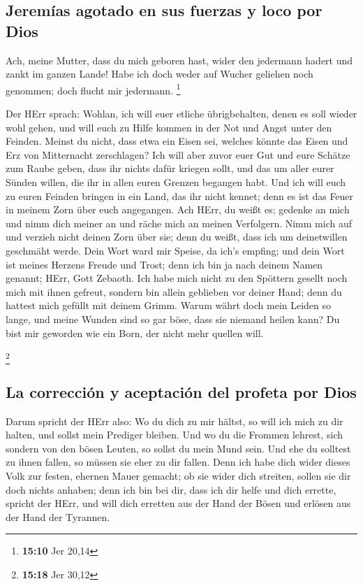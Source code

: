 \hypertarget{jeremuxedas-agotado-en-sus-fuerzas-y-loco-por-dios}{%
\subsection{Jeremías agotado en sus fuerzas y loco por
Dios}\label{jeremuxedas-agotado-en-sus-fuerzas-y-loco-por-dios}}

 Ach, meine Mutter, dass du mich geboren hast, wider den
jedermann hadert und zankt im ganzen Lande! Habe ich doch weder auf
Wucher geliehen noch genommen; doch flucht mir jedermann. \footnote{\textbf{15:10}
  Jer 20,14}

 Der HErr sprach: Wohlan, ich will euer etliche
übrigbehalten, denen es soll wieder wohl gehen, und will euch zu Hilfe
kommen in der Not und Angst unter den Feinden.  Meinst du
nicht, dass etwa ein Eisen sei, welches könnte das Eisen und Erz von
Mitternacht zerschlagen?  Ich will aber zuvor euer Gut
und eure Schätze zum Raube geben, dass ihr nichts dafür kriegen sollt,
und das um aller eurer Sünden willen, die ihr in allen euren Grenzen
begangen habt.  Und ich will euch zu euren Feinden
bringen in ein Land, das ihr nicht kennet; denn es ist das Feuer in
meinem Zorn über euch angegangen.  Ach HErr, du weißt es;
gedenke an mich und nimm dich meiner an und räche mich an meinen
Verfolgern. Nimm mich auf und verzieh nicht deinen Zorn über sie; denn
du weißt, dass ich um deinetwillen geschmäht werde.  Dein
Wort ward mir Speise, da ich's empfing; und dein Wort ist meines Herzens
Freude und Trost; denn ich bin ja nach deinem Namen genannt; HErr, Gott
Zebaoth.  Ich habe mich nicht zu den Spöttern gesellt
noch mich mit ihnen gefreut, sondern bin allein geblieben vor deiner
Hand; denn du hattest mich gefüllt mit deinem Grimm. 
Warum währt doch mein Leiden so lange, und meine Wunden sind so gar
böse, dass sie niemand heilen kann? Du bist mir geworden wie ein Born,
der nicht mehr quellen will.

\footnote{\textbf{15:18} Jer 30,12}

\hypertarget{la-correcciuxf3n-y-aceptaciuxf3n-del-profeta-por-dios}{%
\subsection{La corrección y aceptación del profeta por
Dios}\label{la-correcciuxf3n-y-aceptaciuxf3n-del-profeta-por-dios}}

 Darum spricht der HErr also: Wo du dich zu mir hältst,
so will ich mich zu dir halten, und sollst mein Prediger bleiben. Und wo
du die Frommen lehrest, sich sondern von den bösen Leuten, so sollst du
mein Mund sein. Und ehe du solltest zu ihnen fallen, so müssen sie eher
zu dir fallen.  Denn ich habe dich wider dieses Volk zur
festen, ehernen Mauer gemacht; ob sie wider dich streiten, sollen sie
dir doch nichts anhaben; denn ich bin bei dir, dass ich dir helfe und
dich errette, spricht der HErr,  und will dich erretten
aus der Hand der Bösen und erlösen aus der Hand der Tyrannen.

